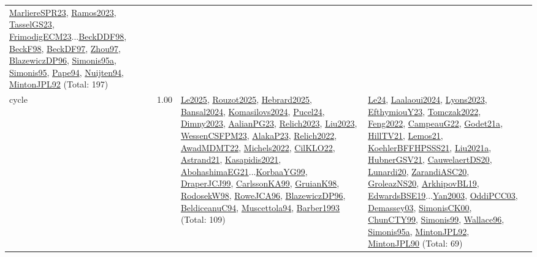 {\begin{longtable}{p{3cm}r>{\raggedright\arraybackslash}p{6cm}>{\raggedright\arraybackslash}p{6cm}>{\raggedright\arraybackslash}p{8cm}}
\hyperref[detail:MarliereSPR23]{MarliereSPR23}, \hyperref[detail:Ramos2023]{Ramos2023}, \hyperref[detail:TasselGS23]{TasselGS23}, \hyperref[detail:FrimodigECM23]{FrimodigECM23}...\hyperref[detail:BeckDDF98]{BeckDDF98}, \hyperref[detail:BeckF98]{BeckF98}, \hyperref[detail:BeckDF97]{BeckDF97}, \hyperref[detail:Zhou97]{Zhou97}, \hyperref[detail:BlazewiczDP96]{BlazewiczDP96}, \hyperref[detail:Simonis95a]{Simonis95a}, \hyperref[detail:Simonis95]{Simonis95}, \hyperref[detail:Pape94]{Pape94}, \hyperref[detail:Nuijten94]{Nuijten94}, \hyperref[detail:MintonJPL92]{MintonJPL92} (Total: 197)\\
\index{cycle}\index{Constraints!cycle}cycle &  1.00 & \hyperref[detail:Le2025]{Le2025}, \hyperref[detail:Rouzot2025]{Rouzot2025}, \hyperref[detail:Hebrard2025]{Hebrard2025}, \hyperref[detail:Bansal2024]{Bansal2024}, \hyperref[detail:Komasilovs2024]{Komasilovs2024}, \hyperref[detail:Pucel24]{Pucel24}, \hyperref[detail:Dimny2023]{Dimny2023}, \hyperref[detail:AalianPG23]{AalianPG23}, \hyperref[detail:Relich2023]{Relich2023}, \hyperref[detail:Liu2023]{Liu2023}, \hyperref[detail:WessenCSFPM23]{WessenCSFPM23}, \hyperref[detail:AlakaP23]{AlakaP23}, \hyperref[detail:Relich2022]{Relich2022}, \hyperref[detail:AwadMDMT22]{AwadMDMT22}, \hyperref[detail:Michels2022]{Michels2022}, \hyperref[detail:CilKLO22]{CilKLO22}, \hyperref[detail:Astrand21]{Astrand21}, \hyperref[detail:Kasapidis2021]{Kasapidis2021}, \hyperref[detail:AbohashimaEG21]{AbohashimaEG21}...\hyperref[detail:KorbaaYG99]{KorbaaYG99}, \hyperref[detail:DraperJCJ99]{DraperJCJ99}, \hyperref[detail:CarlssonKA99]{CarlssonKA99}, \hyperref[detail:GruianK98]{GruianK98}, \hyperref[detail:RodosekW98]{RodosekW98}, \hyperref[detail:RoweJCA96]{RoweJCA96}, \hyperref[detail:BlazewiczDP96]{BlazewiczDP96}, \hyperref[detail:BeldiceanuC94]{BeldiceanuC94}, \hyperref[detail:Muscettola94]{Muscettola94}, \hyperref[detail:Barber1993]{Barber1993} (Total: 109) & \hyperref[detail:Le24]{Le24}, \hyperref[detail:Laalaoui2024]{Laalaoui2024}, \hyperref[detail:Lyons2023]{Lyons2023}, \hyperref[detail:EfthymiouY23]{EfthymiouY23}, \hyperref[detail:Tomczak2022]{Tomczak2022}, \hyperref[detail:Feng2022]{Feng2022}, \hyperref[detail:CampeauG22]{CampeauG22}, \hyperref[detail:Godet21a]{Godet21a}, \hyperref[detail:HillTV21]{HillTV21}, \hyperref[detail:Lemos21]{Lemos21}, \hyperref[detail:KoehlerBFFHPSSS21]{KoehlerBFFHPSSS21}, \hyperref[detail:Liu2021a]{Liu2021a}, \hyperref[detail:HubnerGSV21]{HubnerGSV21}, \hyperref[detail:CauwelaertDS20]{CauwelaertDS20}, \hyperref[detail:Lunardi20]{Lunardi20}, \hyperref[detail:ZarandiASC20]{ZarandiASC20}, \hyperref[detail:GroleazNS20]{GroleazNS20}, \hyperref[detail:ArkhipovBL19]{ArkhipovBL19}, \hyperref[detail:EdwardsBSE19]{EdwardsBSE19}...\hyperref[detail:Yan2003]{Yan2003}, \hyperref[detail:OddiPCC03]{OddiPCC03}, \hyperref[detail:Demassey03]{Demassey03}, \hyperref[detail:SimonisCK00]{SimonisCK00}, \hyperref[detail:ChunCTY99]{ChunCTY99}, \hyperref[detail:Simonis99]{Simonis99}, \hyperref[detail:Wallace96]{Wallace96}, \hyperref[detail:Simonis95a]{Simonis95a}, \hyperref[detail:MintonJPL92]{MintonJPL92}, \hyperref[detail:MintonJPL90]{MintonJPL90} (Total: 69) & 
\end{longtable}}
